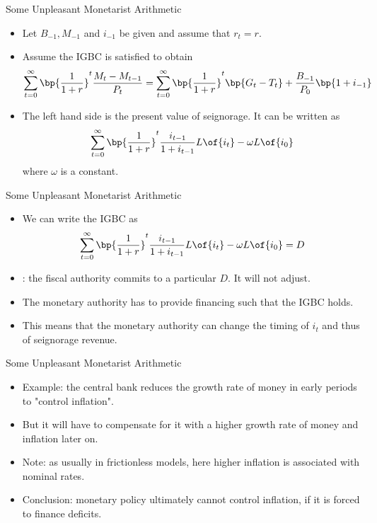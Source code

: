 \documentclass[11pt,xcolor={dvipsnames},aspectratio=159,hyperref={pdftex,pdfpagemode=UseNone,hidelinks,pdfdisplaydoctitle=true},usepdftitle=false]{beamer}
\begin{document}
\begin{frame}{Some Unpleasant Monetarist Arithmetic}
    \begin{itemize}
        \item Let $B_{-1},M_{-1}$ and $i_{-1}$ be given and assume that $r_t = r$. 
        \item Assume the IGBC is satisfied to obtain \begin{align*}
            \sum_{t=0}^\infty \bp{\frac{1}{1+r}}^t \frac{M_t - M_{t-1}}{P_t} =  \sum_{t=0}^\infty \bp{\frac{1}{1+r}}^t \bp{G_t - T_t} + \frac{B_{-1}}{P_0}\bp{1+i_{-1}}
        \end{align*}
        \item The left hand side is the present value of seignorage. It can be written as 
        \begin{align*}
            \sum_{t=0}^\infty \bp{\frac{1}{1+r}}^t \frac{i_{t-1}}{1+i_{t-1}} L\of{i_t} - \omega L\of{i_{0}}
        \end{align*}
        where $\omega$ is a constant. 
    \end{itemize}
\end{frame}

\begin{frame}{Some Unpleasant Monetarist Arithmetic}
\begin{itemize}
        \item We can write the IGBC as \begin{align*}
            \sum_{t=0}^\infty \bp{\frac{1}{1+r}}^t \frac{i_{t-1}}{1+i_{t-1}} L\of{i_t} - \omega L\of{i_{0}} = D  
        \end{align*}
        \item {}: the fiscal authority commits to a particular $D$. It will not adjust. 
        \item The monetary authority has to provide financing such that the IGBC holds. 
        \item This means that the monetary authority can  change the timing of $i_t$ and thus of seignorage revenue.
    \end{itemize}
\end{frame}


\begin{frame}{Some Unpleasant Monetarist Arithmetic}
    \begin{itemize}
            \item Example: the central bank reduces the growth rate of money in early periods to "control inflation".
            \item But it will have to compensate for it with a higher growth rate of money and inflation later on. 
            \item Note: as usually in frictionless models, here higher inflation is associated with  nominal rates.
            \item Conclusion: monetary policy ultimately cannot control inflation, if it is forced to finance deficits. 
        \end{itemize}
    \end{frame}
\end{document}
